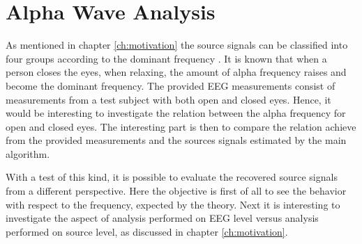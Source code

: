 \section{Alpha Wave Analysis}\label{sec:alpha_test}
As mentioned in chapter \ref{ch:motivation} the source signals can be classified into four groups according to the dominant frequency \cite{EEGsignalprocessing}. 
It is known that when a person closes the eyes, when relaxing, the amount of alpha frequency raises and become the dominant frequency. 
The provided EEG measurements consist of measurements from a test subject with both open and closed eyes.
Hence, it would be interesting to investigate the relation between the alpha frequency for open and closed eyes. 
The interesting part is then to compare the relation achieve from the provided measurements and the sources signals estimated by the main algorithm.

With a test of this kind, it is possible to evaluate the recovered source signals from a different perspective. 
Here the objective is first of all to see the behavior with respect to the frequency, expected by the theory. 
Next it is interesting to investigate the aspect of analysis performed on EEG level versus analysis performed on source level, as discussed in chapter \ref{ch:motivation}.              

